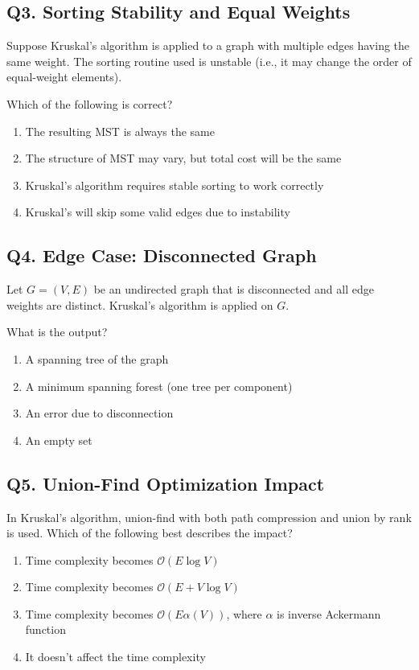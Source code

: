 \subsection*{Q3. Sorting Stability and Equal Weights}
Suppose Kruskal's algorithm is applied to a graph with multiple edges having the same weight. The sorting routine used is unstable (i.e., it may change the order of equal-weight elements).

Which of the following is correct?

\begin{enumerate}[label=(\alph*)]
    \item The resulting MST is always the same
    \item The structure of MST may vary, but total cost will be the same
    \item Kruskal's algorithm requires stable sorting to work correctly
    \item Kruskal’s will skip some valid edges due to instability
\end{enumerate}

\subsection*{Q4. Edge Case: Disconnected Graph}
Let $G = (V, E)$ be an undirected graph that is disconnected and all edge weights are distinct. Kruskal’s algorithm is applied on $G$.

What is the output?

\begin{enumerate}[label=(\alph*)]
    \item A spanning tree of the graph
    \item A minimum spanning forest (one tree per component)
    \item An error due to disconnection
    \item An empty set
\end{enumerate}

\subsection*{Q5. Union-Find Optimization Impact}
In Kruskal's algorithm, union-find with both path compression and union by rank is used. Which of the following best describes the impact?

\begin{enumerate}[label=(\alph*)]
    \item Time complexity becomes $\mathcal{O}(E \log V)$
    \item Time complexity becomes $\mathcal{O}(E + V \log V)$
    \item Time complexity becomes $\mathcal{O}(E \alpha(V))$, where $\alpha$ is inverse Ackermann function
    \item It doesn't affect the time complexity
\end{enumerate}

